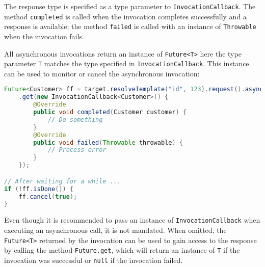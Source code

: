 The response type is specified as a type parameter to \lstinline{InvocationCallback}. The method \lstinline{completed}
is called when the invocation completes successfully and a response is available; the method \lstinline{failed} is
called with an instance of \lstinline{Throwable} when the invocation fails.

All asynchronous invocations return an instance of \lstinline{Future<T>} here the type parameter \lstinline{T} matches
the type specified in \lstinline{InvocationCallback}. This instance can be used to monitor or cancel the asynchronous
invocation:

\begin{lstlisting}[language=Java]
Future<Customer> ff = target.resolveTemplate("id", 123).request().async()
    .get(new InvocationCallback<Customer>() {
        @Override
        public void completed(Customer customer) {
            // Do something
        }
        @Override
        public void failed(Throwable throwable) {
            // Process error
        }
    });

// After waiting for a while ...
if (!ff.isDone()) {
    ff.cancel(true);
} 
\end{lstlisting}

Even though it is recommended to pass an instance of \lstinline{InvocationCallback} when executing an asynchronous call,
it is not mandated. When omitted, the \lstinline{Future<T>} returned by the invocation can be used to gain access to the
response by calling the method \lstinline{Future.get}, which will return an instance of \lstinline{T} if the invocation
was successful or \lstinline{null} if the invocation failed.

